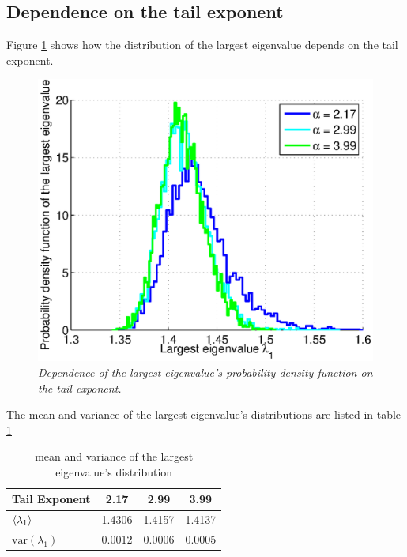 \documentclass{article}
\begin{document}
\subsection{Dependence on the tail exponent}
Figure \ref{fig:eig1_dist_diff_alpha} shows how the distribution of
the largest eigenvalue depends on the tail exponent.
\begin{figure}[htb!]
  \centering
    \includegraphics[scale=0.4]{../pics/eig1_dist_diff_alpha.eps}
    \caption{\small \it Dependence of the largest eigenvalue's
      probability density function on the tail exponent.}
    \label{fig:eig1_dist_diff_alpha}
\end{figure}

The mean and variance of the largest eigenvalue's distributions are
listed in table \ref{tab:eig1_dist_diff_alpha}
\begin{table}[htb!]
  \centering
  \begin{tabular}{|l|c|c|c|}
    \hline
    Tail Exponent & 2.17 & 2.99 & 3.99 \\
    \hline
    $\langle\lambda_1\rangle$ & 1.4306 & 1.4157 & 1.4137 \\
    \hline
    $\text{var}(\lambda_1)$ & 0.0012 & 0.0006 & 0.0005 \\
    \hline
  \end{tabular}
  \caption{mean and variance of the largest eigenvalue's distribution}
  \label{tab:eig1_dist_diff_alpha}
\end{table}




\end{document}
